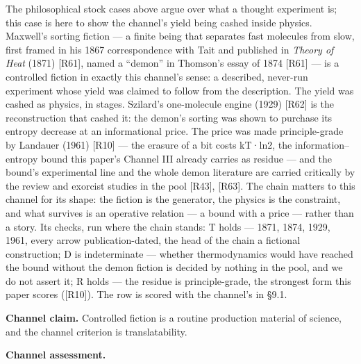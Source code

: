 \documentclass[11pt,a4paper]{article}
\begin{document}
The philosophical stock cases above argue over what a thought experiment is; this case is here to show the channel's yield being cashed inside physics. Maxwell's sorting fiction — a finite being that separates fast molecules from slow, first framed in his 1867 correspondence with Tait and published in \textit{Theory of Heat} (1871) [R61], named a ``demon'' in Thomson's essay of 1874 [R61] — is a controlled fiction in exactly this channel's sense: a described, never-run experiment whose yield was claimed to follow from the description. The yield was cashed as physics, in stages. Szilard's one-molecule engine (1929) [R62] is the reconstruction that cashed it: the demon's sorting was shown to purchase its entropy decrease at an informational price. The price was made principle-grade by Landauer (1961) [R10] — the erasure of a bit costs kT·ln2, the information–entropy bound this paper's Channel III already carries as residue — and the bound's experimental line and the whole demon literature are carried critically by the review and exorcist studies in the pool [R43], [R63]. The chain matters to this channel for its shape: the fiction is the generator, the physics is the constraint, and what survives is an operative relation — a bound with a price — rather than a story. Its checks, run where the chain stands: T holds — 1871, 1874, 1929, 1961, every arrow publication-dated, the head of the chain a fictional construction; D is indeterminate — whether thermodynamics would have reached the bound without the demon fiction is decided by nothing in the pool, and we do not assert it; R holds — the residue is principle-grade, the strongest form this paper scores ([R10]). The row is scored with the channel's in §9.1.

\textbf{Channel claim.} Controlled fiction is a routine production material of science, and the channel criterion is translatability.

\textbf{Channel assessment.}
\end{document}
